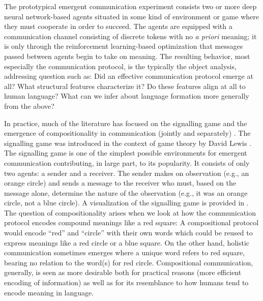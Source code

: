 The prototypical emergent communication experiment consists two or more deep neural network-based agents situated in some kind of environment or game where they must cooperate in order to succeed.
The agents are equipped with a communication channel consisting of discrete tokens with no \emph{a priori} meaning; it is only through the reinforcement learning-based optimization that messages passed between agents begin to take on meaning.
The resulting behavior, most especially the communication protocol, is the typically the object analysis, addressing question such as:
  Did an effective communication protocol emerge at all?
  What structural features characterize it?
  Do these features align at all to human language?
  What can we infer about language formation more generally from the above?

In practice, much of the literature has focused on the signalling game and the emergence of compositionality in communication (jointly and separately)
  \citep{havrylov2017sequence,mordatch2018grounded,chaabouni2022emergent}.
The signalling game was introduced in the context of game theory by David Lewis \citep{lewis1970ConventionAP}.
The signalling game is one of the simplest possible environments for emergent communication contributing, in large part, to its popularity.
It consists of only two agents: a sender and a receiver.
The sender makes on observation (e.g., an orange circle) and sends a message to the receiver who must, based on the message alone, determine the nature of the observation (e.g., it was an orange circle, not a blue circle).
A visualization of the signalling game is provided in .
The question of compositionality arises when we look at how the communication protocol encodes compound meanings like a red square: A compositional protocol would encode ``red'' and ``circle'' with their own words which could be reused to express meanings like a red circle or a blue square.
On the other hand, holistic communication sometimes emerges where a unique word refers to red square, bearing no relation to the word(s) for red circle.
Compositional communication, generally, is seen as more desirable both for practical reasons (more efficient encoding of information) as well as for its resemblance to how humans tend to encode meaning in language.

